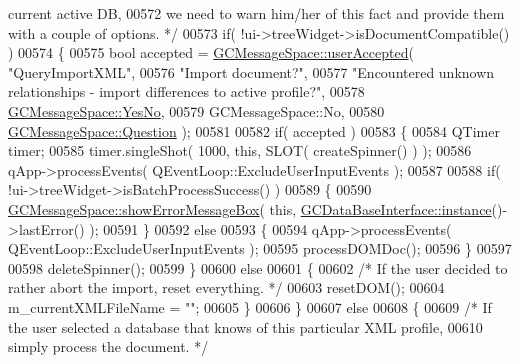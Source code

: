 \begin{DoxyCode}
{{{{       current active DB,}
00572 \textcolor{comment}{        we need to warn him/her of this fact and provide them with a couple of
       options. */}
00573     \textcolor{keywordflow}{if}( !ui->treeWidget->isDocumentCompatible() )
00574     \{
00575       \textcolor{keywordtype}{bool} accepted = \hyperlink{namespace_g_c_message_space_ae6f97d25f38a6b35c49e6e67ce4afaca}{GCMessageSpace::userAccepted}( \textcolor{stringliteral}{"QueryImportXML"},
00576                                                     \textcolor{stringliteral}{"Import document?"},
00577                                                     \textcolor{stringliteral}{"Encountered unknown
       relationships - import differences to active profile?"},
00578                                                     \hyperlink{namespace_g_c_message_space_ac1db082c29062fe6508ba03bf76bea44ab2defe87f3e886edf34f537f4ac8c282}{GCMessageSpace::YesNo},
00579                                                     GCMessageSpace::No,
00580                                                     \hyperlink{namespace_g_c_message_space_a67e94586e09cbc305257fbcdd7b686e2ae66d6709c87ccb0832b1456e2b4ad895}{GCMessageSpace::Question} );
00581 
00582       \textcolor{keywordflow}{if}( accepted )
00583       \{
00584         QTimer timer;
00585         timer.singleShot( 1000, \textcolor{keyword}{this}, SLOT( createSpinner() ) );
00586         qApp->processEvents( QEventLoop::ExcludeUserInputEvents );
00587 
00588         \textcolor{keywordflow}{if}( !ui->treeWidget->isBatchProcessSuccess() )
00589         \{
00590           \hyperlink{namespace_g_c_message_space_ab118b3a133686167617eb955029fd44e}{GCMessageSpace::showErrorMessageBox}( \textcolor{keyword}{this}, 
      \hyperlink{class_g_c_data_base_interface_a1baea9c0667aa8b610ec30076fcab84c}{GCDataBaseInterface::instance}()->lastError() );
00591         \}
00592         \textcolor{keywordflow}{else}
00593         \{
00594           qApp->processEvents( QEventLoop::ExcludeUserInputEvents );
00595           processDOMDoc();
00596         \}
00597 
00598         deleteSpinner();
00599       \}
00600       \textcolor{keywordflow}{else}
00601       \{
00602         \textcolor{comment}{/* If the user decided to rather abort the import, reset everything. */}
00603         resetDOM();
00604         m\_currentXMLFileName = \textcolor{stringliteral}{""};
00605       \}
00606     \}
00607     \textcolor{keywordflow}{else}
00608     \{
00609       \textcolor{comment}{/* If the user selected a database that knows of this particular XML
       profile,}
00610 \textcolor{comment}{          simply process the document. */}
}}}
\end{DoxyCode}
